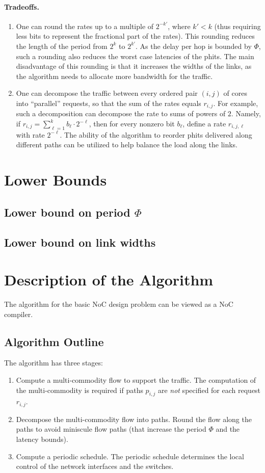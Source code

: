 \documentclass[a4paper,12pt]{article}
\newenvironment{proof sketch}[1]{\noindent {\emph{Proof sketch of #1:}}}{\hfill \qed}
\begin{document}
\paragraph{Tradeoffs.}
\begin{enumerate}
\item One can round the rates up to a multiple of $2^{-k'}$, where $k'<k$ (thus
  requiring less bits to represent the fractional part of the rates). This rounding
  reduces the length of the period from $2^k$ to $2^{k'}$.  As the delay per hop is
  bounded by $\Phi$, such a rounding also reduces the worst case latencies of the
  phits.  The main disadvantage of this rounding is that it increases the widths of
  the links, as the algorithm needs to allocate more bandwidth for the traffic.
\item One can decompose the traffic between every ordered pair $(i,j)$ of cores into
  ``parallel'' requests, so that the sum of the rates equals $r_{i,j}$.  For example,
  such a decomposition can decompose the rate to sums of powers of $2$. Namely, if
  $r_{i,j} = \sum_{\ell=1}^{k} b_{\ell} \cdot 2^{-\ell}$, then for every nonzero bit
  $b_{\ell}$, define a rate $r_{i,j,\ell}$ with rate $2^{-\ell}$. The ability of the
  algorithm to reorder phits delivered along different paths can be utilized to help
  balance the load along the links.
\end{enumerate}

\section{Lower Bounds}

\subsection{Lower bound on period $\Phi$}

\subsection{Lower bound on link widths}

\section{Description of the Algorithm}
The algorithm for the basic NoC design problem
can be viewed as a NoC compiler.
\subsection{Algorithm Outline}
The algorithm has three stages:
\begin{enumerate}
\item Compute a multi-commodity flow to support the traffic.  The computation of the
  multi-commodity is required if paths $p_{i,j}$ are \emph{not} specified for each
  request $r_{i,j}$.
\item Decompose the multi-commodity flow into paths. Round the flow along the paths
  to avoid miniscule flow paths (that increase the period $\Phi$ and the latency
  bounds).
\item Compute a periodic schedule. The periodic schedule determines the local control
  of the network interfaces and the switches.
\end{enumerate}
\end{document}
